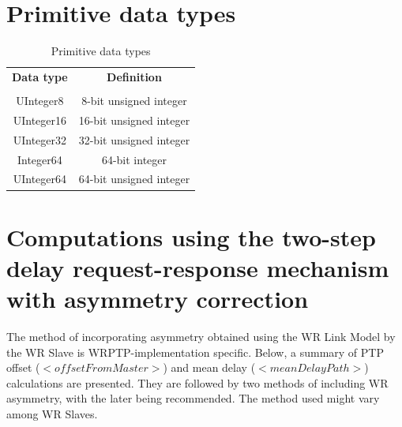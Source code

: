 \documentclass[a4paper, 12pt]{article}
\begin{document}
\section{Primitive data types}
\label{ap:wrDataTypes}

\begin{table}[ht!]
\caption{Primitive data types}
\centering
\begin{tabular}{| c | c |}          					\hline
\textbf{Data type  } &  \textbf{Definition}				  \\ 
		     &  	               				  \\ \hline
UInteger8	     &   8-bit unsigned integer				  \\ \hline
UInteger16	     &  16-bit unsigned integer				  \\ \hline
UInteger32	     &  32-bit unsigned integer				  \\ \hline
 Integer64	     &  64-bit integer					  \\ \hline
UInteger64	     &  64-bit unsigned integer				  \\ \hline
\end{tabular}
\label{tab:wrPtpProfile}
\end{table}


\section{Computations using the two-step delay request-response mechanism with asymmetry correction}
\label{ap:computationsExplanation}

The method of incorporating asymmetry obtained using the WR Link Model by the WR Slave 
is WRPTP-implementation specific. Below, a summary of PTP offset ($<offsetFromMaster>$) 
and mean delay ($<meanDelayPath>$) calculations are presented. They are followed by 
two methods of including WR asymmetry, with the later being recommended. 
The method used might vary among WR Slaves.
\end{document}
